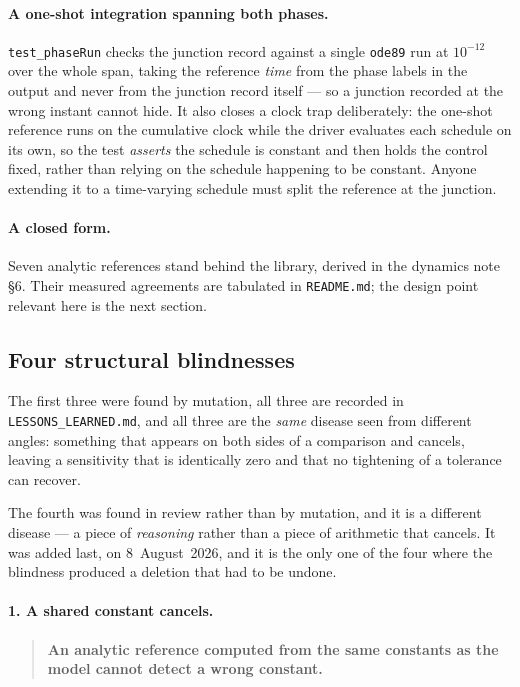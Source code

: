 \documentclass[11pt]{article}
\newcommand{\code}[1]{\texttt{#1}}
\begin{document}
\paragraph{A one-shot integration spanning both phases.}
\code{test\_phaseRun} checks the junction record against a single \code{ode89}
run at $10^{-12}$ over the whole span, taking the reference \emph{time} from
the phase labels in the output and never from the junction record itself --- so
a junction recorded at the wrong instant cannot hide. It also closes a clock
trap deliberately: the one-shot reference runs on the cumulative clock while
the driver evaluates each schedule on its own, so the test \emph{asserts} the
schedule is constant and then holds the control fixed, rather than relying on
the schedule happening to be constant. Anyone extending it to a time-varying
schedule must split the reference at the junction.

\paragraph{A closed form.} Seven analytic references stand behind the library,
derived in the dynamics note \S6. Their measured agreements are tabulated in
\code{README.md}; the design point relevant here is the next section.

\subsection{Four structural blindnesses}
\label{sec:blind}

The first three were found by mutation, all three are recorded in
\code{LESSONS\_LEARNED.md}, and all three are the \emph{same} disease seen from
different angles: something that appears on both sides of a comparison and
cancels, leaving a sensitivity that is identically zero and that no tightening
of a tolerance can recover.

The fourth was found in review rather than by mutation, and it is a different
disease --- a piece of \emph{reasoning} rather than a piece of arithmetic that
cancels. It was added last, on 8~August~2026, and it is the only one of the
four where the blindness produced a deletion that had to be undone.

\paragraph{1. A shared constant cancels.}

\begin{quote}
\textbf{An analytic reference computed from the same constants as the model
cannot detect a wrong constant.}
\end{quote}
\end{document}
